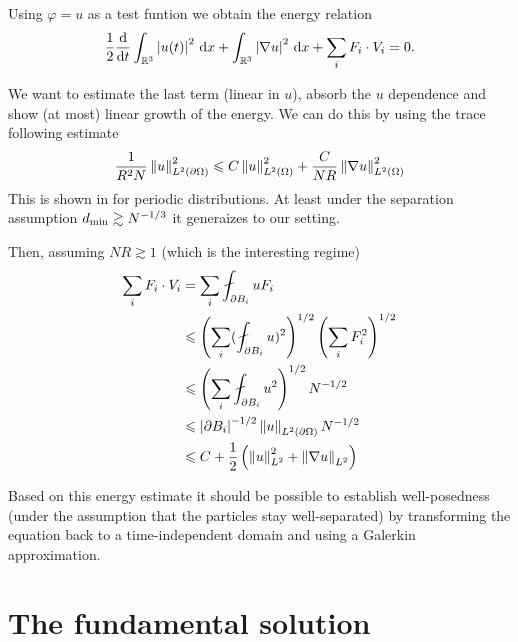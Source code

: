 \documentclass[abstracton, paper=a4, fontsize=11pt,DIV=12,bibliography=totoc]{scrartcl}
\begin{document}
Using $\varphi=u$ as a test funtion we obtain the energy relation
\begin{align*}
    \frac 12\frac{{\mathrm{d}}}{{\mathrm{d}} t} \int_{\mathbb{R}^3} \left\lvert u(t)\right\rvert^2\, \mathrm{d} x+\int_{\mathbb{R}^3} \left\lvert\nabla u\right\rvert^2\, \mathrm{d} x+\sum_i F_i \cdot V_i=0.
\end{align*}

We want to estimate the last term (linear in $u$), absorb the $u$ dependence and show (at most) linear growth of the energy. 
We can do this by using the trace following estimate 
\begin{align*}
    \frac{1}{R^2 N}\left\lVert u\right\rVert_{L^2(\partial \Omega)}^2\leqslant C \left\lVert u\right\rVert^2_{L^2(\Omega)} + \frac{C}{NR} \left\lVert\nabla u\right\rVert_{L^2(\Omega)}^2
\end{align*}
This is shown in  \cite[Lemma 2.3]{Allaire_slip} for periodic distributions. At least under the separation assumption $d_{\mathrm{min}} \gtrsim N^{-1/3}$ it generaizes to our setting.

Then, assuming $NR \gtrsim 1$ (which is the interesting regime)
\begin{align*}
    \sum_i F_i\cdot V_i &=\sum_i \fint_{\partial B_i}uF_i\\
    &\le \bra{\sum_i (\fint_{\partial B_i} u)^2}^{1/2}\bra{\sum_i F_i^2}^{1/2}\\
    &\le \bra{\sum_i \fint_{\partial B_i} u^2}^{1/2}N^{-1/2}\\
    &\le \abs{\partial B_i}^{-1/2}\norm{u}_{L^2(\partial\Omega)}N^{-1/2}\\
    &\le C + \frac 1 2 \left(\norm{ u}^2_{L^2} + \norm{\nabla u}_{L^2}\right)
\end{align*}

Based on this energy estimate it should be possible to establish well-posedness (under the assumption that the particles stay well-separated) by transforming the equation back to a time-independent domain and using a Galerkin approximation.


\section{The fundamental solution}
\end{document}
